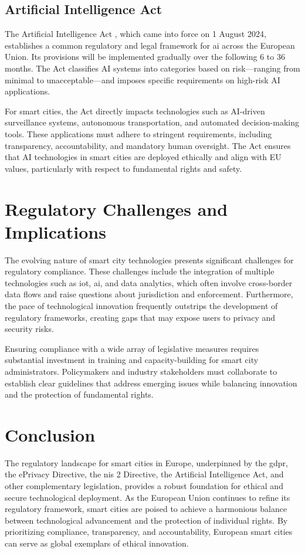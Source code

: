 \subsection{Artificial Intelligence Act}

The Artificial Intelligence Act \autocite{eu-1689-2024}, which came into force on 1 August 2024, establishes a common regulatory and legal framework for \gls{ai} across the European Union. Its provisions will be implemented gradually over the following 6 to 36 months. The Act classifies AI systems into categories based on risk—ranging from minimal to unacceptable—and imposes specific requirements on high-risk AI applications.

For smart cities, the Act directly impacts technologies such as AI-driven surveillance systems, autonomous transportation, and automated decision-making tools. These applications must adhere to stringent requirements, including transparency, accountability, and mandatory human oversight. The Act ensures that AI technologies in smart cities are deployed ethically and align with EU values, particularly with respect to fundamental rights and safety.

\section{Regulatory Challenges and Implications}

The evolving nature of smart city technologies presents significant challenges for regulatory compliance. These challenges include the integration of multiple technologies such as \gls{iot}, \gls{ai}, and data analytics, which often involve cross-border data flows and raise questions about jurisdiction and enforcement. Furthermore, the pace of technological innovation frequently outstrips the development of regulatory frameworks, creating gaps that may expose users to privacy and security risks.

Ensuring compliance with a wide array of legislative measures requires substantial investment in training and capacity-building for smart city administrators. Policymakers and industry stakeholders must collaborate to establish clear guidelines that address emerging issues while balancing innovation and the protection of fundamental rights.

\section{Conclusion}

The regulatory landscape for smart cities in Europe, underpinned by the \gls{gdpr}, the ePrivacy Directive, the \gls{nis} 2 Directive, the Artificial Intelligence Act, and other complementary legislation, provides a robust foundation for ethical and secure technological deployment. As the European Union continues to refine its regulatory framework, smart cities are poised to achieve a harmonious balance between technological advancement and the protection of individual rights. By prioritizing compliance, transparency, and accountability, European smart cities can serve as global exemplars of ethical innovation.

